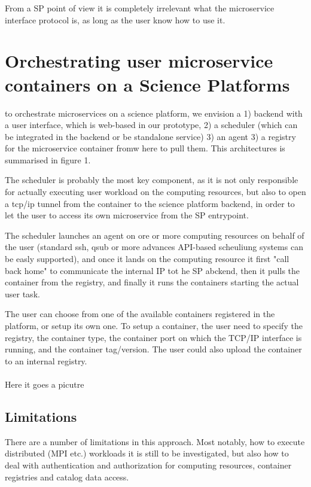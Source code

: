 \documentclass[11pt,twoside]{article}
\begin{document}
From a SP point of view it is completely irrelevant what the microservice interface protocol is, as long as the user know how to use it. 



\section{Orchestrating user microservice containers on a Science Platforms}
to orchestrate microservices on a science platform, we envision a 1) backend with a user interface, which is web-based in our prototype, 2) a scheduler (which can be integrated in the backend or be standalone service) 3) an agent 3) a registry for the microservice container fromw here to pull them. This architectures is summarised in figure 1.

The scheduler is probably the most key component, as it is not only responsible for actually executing user workload on the computing resources, but also to open a tcp/ip tunnel from the container to the science platform backend, in order to let the user to access its own microservice from the SP entrypoint.

The scheduler launches an agent on ore or more computing resources on behalf of the user (standard ssh, qsub or more advances API-based scheuliung systems can be easly supported), and once it lands on the computing resource it first "call back home"  to communicate the internal IP tot he SP abckend, then it pulls the container from the registry, and finally it runs the containers starting the actual user task.

The user can choose from one of the available containers registered in the platform, or setup its own one. To setup a container, the user need to specify the registry, the container type, the container port on which the TCP/IP interface is running, and the container tag/version. The user could also upload the container to an internal registry.
\\
\\
Here it goes a picutre



\subsection{Limitations}
There are a number of limitations in this approach. Most notably, how to execute distributed (MPI etc.)  workloads it is still to be investigated, but also how to deal with authentication and authorization for computing resources, container registries and catalog data access.
\end{document}
